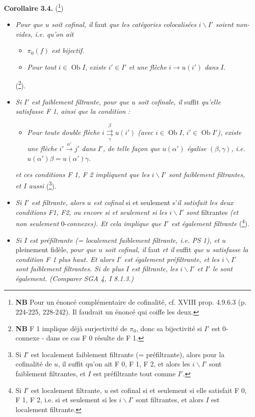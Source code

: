 \documentclass[11pt]{article}
\newcommand{\printedpage}[1]{\marginpar{\footnotesize p.~#1}}
\newcommand{\msp}[1]{\marginpar{\footnotesize [#1]}}
\newcommand{\Ob}{\operatorname{Ob}}
\newcommand{\bs}{\backslash}
\newcommand{\dbl}[2]{\mathrel{\overset{#1}{\underset{#2}{\rightrightarrows}}}}
\begin{document}
\noindent\textbf{Corollaire 3.4.} (\footnote[55]{\textbf{NB} Pour un énoncé complémentaire de cofinalité, cf. XVIII prop. 4.9.6.3 (p. 224-225, 228-242). Il faudrait un énoncé qui coiffe les deux.})
\begin{itemize}[label={}]
\item[\textit{a)}] \textit{Pour que $u$ soit cofinal, il} faut \textit{que les catégories colocalisées $i\bs I'$ soient non-vides, i.e. qu'on ait}

\msp{page 46}
\begin{itemize}[label={}]
\item[\textit{F 0)}] $\pi_0(f)$ \textit{est bijectif.}
\item[\textit{F 1)}] \textit{Pour tout} $i \in \Ob I$, \textit{existe} $i' \in I'$ \textit{et une flèche} $i \longrightarrow u(i')$ \textit{dans} $I$.
\end{itemize}
(\footnote[56]{\textbf{NB} F 1 implique déjà surjectivité de $\pi_0$, donc sa bijectivité si $I'$ est 0-connexe - dans ce cas F 0 résulte de F 1.}).
\item[\textit{b)}] \textit{Si $I'$ est faiblement filtrante, pour que $u$ soit cofinale, il} suffit \textit{qu'elle satisfasse F 1, ainsi que la condition :}
\begin{itemize}[label={}]
\item[\textit{F 2)}] \textit{Pour toute double flèche} $i \dbl{\beta}{\gamma} u(i')$ \textit{(avec} $i \in \Ob I$, $i' \in \Ob I'$\textit{),} \textit{existe une flèche} $i' \xrightarrow{\alpha'} j'$ \textit{dans} $I'$\textit{, de telle façon que} $u(\alpha')$ \textit{égalise} $(\beta, \gamma)$\textit{, i.e.} $u(\alpha')\beta = u(\alpha')\gamma$.
\end{itemize}
\textit{et ces conditions F 1, F 2 impliquent que les $i\bs I'$ sont faiblement filtrantes, et $I$ aussi} (\footnote[57]{Si $I'$ est localement faiblement filtrante (= préfiltrante), alors pour la cofinalité de $u$, il suffit qu'on ait F 0, F 1, F 2, et alors les $i\bs I'$ sont faiblement filtrantes, et $I$ est préfiltrante tout comme $I'$.}).

\printedpage{30}
\item[\textit{c)}] \textit{Si $I'$ est filtrante, alors $u$ est cofinal} si et seulement s'\textit{il satisfait les deux conditions F1, F2, ou encore si et seulement si les $i\bs I'$ sont} filtrantes \textit{(et non seulement} 0-\textit{connexes). Et cela implique que $I'$ est également filtrante} (\footnote[58]{Si $I'$ est localement filtrante, $u$ est cofinal si et seulement si elle satisfait F 0, F 1, F 2, i.e. si et seulement si les $i\bs I'$ sont filtrantes, et alors $I$ est localement filtrante.}).
\item[\textit{d)}] \textit{Si $I$ est préfiltrante (= localement faiblement filtrante, i.e. PS 1), et $u$} pleinement fidèle, \textit{pour que $u$ soit cofinal, il} faut \textit{et il} suffit \textit{que $u$ satisfasse la condition F 1 plus haut. Et alors $I'$ est également préfiltrante, et les $i\bs I'$ sont faiblement filtrantes. Si de plus $I$ est filtrante, les $i\bs I'$ et $I'$ le sont également. (Comparer SGA 4, I 8.1.3.)}
\end{itemize}
\end{document}
